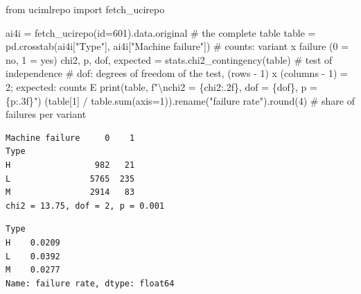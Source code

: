 \documentclass[
  letterpaper,
  DIV=11,
  numbers=noendperiod]{scrreprt}
\newenvironment{Shaded}{\begin{snugshade}}{\end{snugshade}}
\newcommand{\BuiltInTok}[1]{\textcolor[rgb]{0.00,0.23,0.31}{#1}}
\newcommand{\CharTok}[1]{\textcolor[rgb]{0.13,0.47,0.30}{#1}}
\newcommand{\CommentTok}[1]{\textcolor[rgb]{0.37,0.37,0.37}{#1}}
\newcommand{\DecValTok}[1]{\textcolor[rgb]{0.68,0.00,0.00}{#1}}
\newcommand{\ImportTok}[1]{\textcolor[rgb]{0.00,0.46,0.62}{#1}}
\newcommand{\NormalTok}[1]{\textcolor[rgb]{0.00,0.23,0.31}{#1}}
\newcommand{\OperatorTok}[1]{\textcolor[rgb]{0.37,0.37,0.37}{#1}}
\newcommand{\SpecialCharTok}[1]{\textcolor[rgb]{0.37,0.37,0.37}{#1}}
\newcommand{\SpecialStringTok}[1]{\textcolor[rgb]{0.13,0.47,0.30}{#1}}
\newcommand{\StringTok}[1]{\textcolor[rgb]{0.13,0.47,0.30}{#1}}
\begin{document}
\begin{tcolorbox}[enhanced jigsaw, left=2mm, title=\textcolor{quarto-callout-caution-color}{\faFire}\hspace{0.5em}{Solution to Exercise 5}, opacityback=0, breakable, rightrule=.15mm, arc=.35mm, toptitle=1mm, colbacktitle=quarto-callout-caution-color!10!white, opacitybacktitle=0.6, coltitle=black, colframe=quarto-callout-caution-color-frame, bottomrule=.15mm, leftrule=.75mm, bottomtitle=1mm, titlerule=0mm, toprule=.15mm, colback=white]

\begin{Shaded}
\begin{Highlighting}[]
\ImportTok{from}\NormalTok{ ucimlrepo }\ImportTok{import}\NormalTok{ fetch\_ucirepo}

\NormalTok{ai4i }\OperatorTok{=}\NormalTok{ fetch\_ucirepo(}\BuiltInTok{id}\OperatorTok{=}\DecValTok{601}\NormalTok{).data.original                  }\CommentTok{\# the complete table}
\NormalTok{table }\OperatorTok{=}\NormalTok{ pd.crosstab(ai4i[}\StringTok{"Type"}\NormalTok{], ai4i[}\StringTok{"Machine failure"}\NormalTok{])  }\CommentTok{\# counts: variant x failure (0 = no, 1 = yes)}
\NormalTok{chi2, p, dof, expected }\OperatorTok{=}\NormalTok{ stats.chi2\_contingency(table)      }\CommentTok{\# test of independence}
\CommentTok{\# dof: degrees of freedom of the test, (rows {-} 1) x (columns {-} 1) = 2; expected: counts E}
\BuiltInTok{print}\NormalTok{(table, }\SpecialStringTok{f"}\CharTok{\textbackslash{}n}\SpecialStringTok{chi2 = }\SpecialCharTok{\{}\NormalTok{chi2}\SpecialCharTok{:.2f\}}\SpecialStringTok{, dof = }\SpecialCharTok{\{}\NormalTok{dof}\SpecialCharTok{\}}\SpecialStringTok{, p = }\SpecialCharTok{\{}\NormalTok{p}\SpecialCharTok{:.3f\}}\SpecialStringTok{"}\NormalTok{)}
\NormalTok{(table[}\DecValTok{1}\NormalTok{] }\OperatorTok{/}\NormalTok{ table.}\BuiltInTok{sum}\NormalTok{(axis}\OperatorTok{=}\DecValTok{1}\NormalTok{)).rename(}\StringTok{"failure rate"}\NormalTok{).}\BuiltInTok{round}\NormalTok{(}\DecValTok{4}\NormalTok{)  }\CommentTok{\# share of failures per variant}
\end{Highlighting}
\end{Shaded}

\begin{verbatim}
Machine failure     0    1
Type                      
H                 982   21
L                5765  235
M                2914   83 
chi2 = 13.75, dof = 2, p = 0.001
\end{verbatim}

\begin{verbatim}
Type
H    0.0209
L    0.0392
M    0.0277
Name: failure rate, dtype: float64
\end{verbatim}


\end{tcolorbox}
\end{document}
